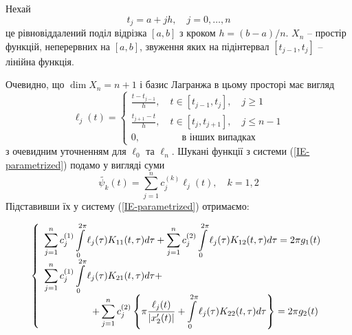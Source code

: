 \documentclass[14pt,a4paper]{extarticle}
\newcounter{e}
\numberwithin{equation}{section}
\numberwithin{figure}{section}
\newcommand{\intl}{\int\limits}
\newcommand{\inttwopi}{\intl_{0}^{2\pi}}
\begin{document}
 Нехай
 \begin{equation}
 	\label{tabulation}
 	t_{j}=a+j h, \quad j=0, \ldots, n
 \end{equation} 
 це рівновіддалений поділ відрізка $[a, b]$ з кроком $h=(b-a) / n$. $X_{n} $ -- простір функцій, неперервних на $[a, b]$, звуження яких на підінтервал $[t_{j-1}, t_{j}]$ -- лінійна функція.
 
 Очевидно, що $\dim X_n = n+1$ і базис Лагранжа в цьому просторі має вигляд
 \begin{equation}
	 \label{basis}
	 \ell_{j}(t)=\left\{
	 \begin{array}{lc}
	 	\displaystyle
	 	\frac{t-t_{j-1}}{h}, \quad t \in\left[t_{j-1}, t_{j}\right], \quad j \geq 1 \\
	 	\displaystyle
	 	\frac{t_{j+1}-t}{h}, \quad t \in\left[t_{j}, t_{j+1}\right], \quad j \leq n-1 \\
	 	0, \qquad\qquad \text { в інших випадках }
	 \end{array}\right.
 \end{equation}
 з очевидним уточненням для $\ell_0$ та $\ell_n$.
 Шукані функції з системи (\ref{IE-parametrized}) подамо у вигляді суми
 \begin{equation}
 	\tilde{\psi_k}(t)=\sum_{j=1}^{n} c^{(k)}_{j} \ell_{j}(t), \quad k = 1,2
 \end{equation}
 Підставивши їх у систему (\ref{IE-parametrized}) отримаємо:
 
 \begin{equation}
	 \label{coll-sys}
	 \left\{
	 \begin{array}{l}
	 	\displaystyle
	 	  \sum_{j=1}^{n} c^{(1)}_{j} \inttwopi \ell_{j}(\tau) K_{11}(t, \tau) d \tau
	 	+ \sum_{j=1}^{n} c^{(2)}_{j} \inttwopi \ell_{j}(\tau) K_{12}(t, \tau) d \tau
	 	= 2\pi g_{1}(t)
	 	\\ [0.3cm]
	 	
	 	\displaystyle
	 	  \sum_{j=1}^{n} c^{(1)}_{j} \inttwopi \ell_{j}(\tau) K_{21}(t, \tau) d \tau +
	 	\\ [0.3cm]
	 	
	 	\displaystyle
	 	\qquad \qquad \quad
	 	+ \sum_{j=1}^{n} c^{(2)}_{j} \left\{
	 	      \pi \frac{\ell_{j}(t)}{\abs{x'_{2}(t)}}
	 	    + \inttwopi \ell_{j}(\tau) K_{22}(t, \tau) d \tau
	 	  \right\}
	 	= 2\pi g_{2}(t)
	 \end{array}\right.
 \end{equation}
 
\end{document}
